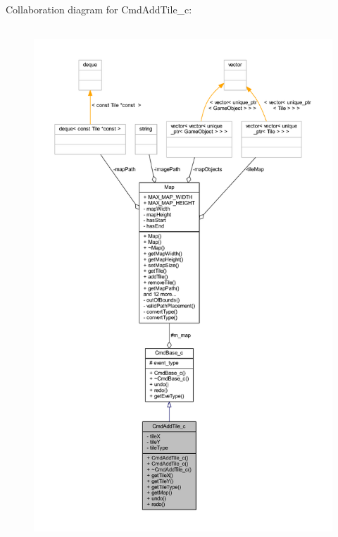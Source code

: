 Collaboration diagram for Cmd\+Add\+Tile\+\_\+c\+:
\nopagebreak
\begin{figure}[H]
\begin{center}
\leavevmode
\includegraphics[height=550pt]{class_cmd_add_tile__c__coll__graph}
\end{center}
\end{figure}
